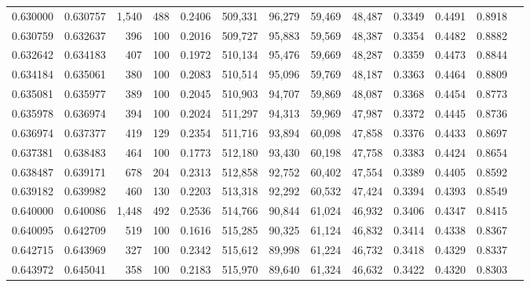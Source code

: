\begin{tabular}{rrrrrrrrrrrrr}
0.630000 & 0.630757 & 1,540 & 488 &                                     0.2406 & 509,331 &  96,279 &  59,469 &  48,487 & 0.3349 & 0.4491 & 0.8918 \\
0.630759 & 0.632637 &   396 & 100 &                                     0.2016 & 509,727 &  95,883 &  59,569 &  48,387 & 0.3354 & 0.4482 & 0.8882 \\
0.632642 & 0.634183 &   407 & 100 &                                     0.1972 & 510,134 &  95,476 &  59,669 &  48,287 & 0.3359 & 0.4473 & 0.8844 \\
0.634184 & 0.635061 &   380 & 100 &                                     0.2083 & 510,514 &  95,096 &  59,769 &  48,187 & 0.3363 & 0.4464 & 0.8809 \\
0.635081 & 0.635977 &   389 & 100 &                                     0.2045 & 510,903 &  94,707 &  59,869 &  48,087 & 0.3368 & 0.4454 & 0.8773 \\
0.635978 & 0.636974 &   394 & 100 &                                     0.2024 & 511,297 &  94,313 &  59,969 &  47,987 & 0.3372 & 0.4445 & 0.8736 \\
0.636974 & 0.637377 &   419 & 129 &                                     0.2354 & 511,716 &  93,894 &  60,098 &  47,858 & 0.3376 & 0.4433 & 0.8697 \\
0.637381 & 0.638483 &   464 & 100 &                                     0.1773 & 512,180 &  93,430 &  60,198 &  47,758 & 0.3383 & 0.4424 & 0.8654 \\
0.638487 & 0.639171 &   678 & 204 &                                     0.2313 & 512,858 &  92,752 &  60,402 &  47,554 & 0.3389 & 0.4405 & 0.8592 \\
0.639182 & 0.639982 &   460 & 130 &                                     0.2203 & 513,318 &  92,292 &  60,532 &  47,424 & 0.3394 & 0.4393 & 0.8549 \\
0.640000 & 0.640086 & 1,448 & 492 &                                     0.2536 & 514,766 &  90,844 &  61,024 &  46,932 & 0.3406 & 0.4347 & 0.8415 \\
0.640095 & 0.642709 &   519 & 100 &                                     0.1616 & 515,285 &  90,325 &  61,124 &  46,832 & 0.3414 & 0.4338 & 0.8367 \\
0.642715 & 0.643969 &   327 & 100 &                                     0.2342 & 515,612 &  89,998 &  61,224 &  46,732 & 0.3418 & 0.4329 & 0.8337 \\
0.643972 & 0.645041 &   358 & 100 &                                     0.2183 & 515,970 &  89,640 &  61,324 &  46,632 & 0.3422 & 0.4320 & 0.8303 \\

\end{tabular}
